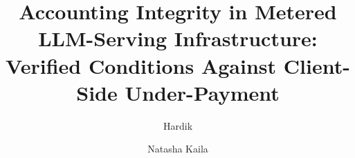 \documentclass[final,5p,times,number]{elsarticle}
\begin{document}
\begin{frontmatter}

\title{Accounting Integrity in Metered LLM-Serving Infrastructure:
Verified Conditions Against Client-Side Under-Payment}

\author[iitp,vipstc]{Hardik}
\author[vipstc]{Natasha Kaila}
\address[iitp]{Department of Computer Science and Data Analytics, Indian Institute of
Technology Patna, India}
\address[vipstc]{Vivekananda Institute of Professional Studies -- Technical Campus,
New Delhi, India}

\end{frontmatter}
\end{document}

